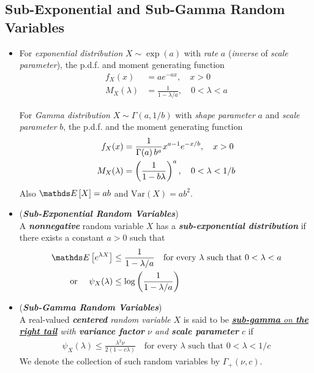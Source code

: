\documentclass[11pt]{article}
\begin{document}
\subsection{Sub-Exponential and Sub-Gamma Random Variables}
\begin{itemize}
\item \begin{remark}
For \emph{exponential distribution} $X \sim \exp(a)$ with \emph{rate} $a$ (\emph{inverse} of \emph{scale parameter}), the p.d.f. and moment generating function
\begin{align*}
f_{X}(x) &= a e^{-ax},\quad  x > 0\\
M_{X}(\lambda) &= \frac{1}{1  - \lambda/a},\quad  0 < \lambda < a
\end{align*}

For \emph{Gamma distribution} $X \sim \Gamma(a, 1/b)$ with \emph{shape parameter} $a$ and \emph{scale parameter} $b$, the p.d.f. and the moment generating function
\begin{align*}
f_{X}(x) &= \frac{1}{\Gamma(a)\,b^a} x^{a-1} e^{-x/b},\quad  x > 0\\
M_{X}(\lambda) &= \left(\frac{1}{1  - b \lambda }\right)^{a},\quad  0 < \lambda < 1/b
\end{align*}Also $\E{}{X} = ab$ and $\text{Var}(X) = ab^2$.
\end{remark}



\item \begin{definition}(\emph{\textbf{Sub-Exponential Random Variables}})\\
A \emph{\textbf{nonnegative}} random variable $X$ has a \emph{\textbf{sub-exponential distribution}} if there exists a constant $a > 0$ such that
\begin{align*}
\E{}{e^{\lambda X}} &\le \frac{1}{1 - \lambda/a} \quad \text{for every $\lambda$ such that $0 < \lambda < a$} \\
\text{or }\quad \psi_X(\lambda) &\le \log\paren{ \frac{1}{1 - \lambda/a}}
\end{align*}
\end{definition}

\item \begin{definition}(\emph{\textbf{Sub-Gamma Random Variables}})\\
A real-valued \emph{\textbf{centered} random variable} $X$ is said to be \emph{\underline{\textbf{sub-gamma} on \textbf{the right tail}} with \textbf{variance factor} $\nu$ and \textbf{scale parameter} $c$} if
\begin{align*}
\psi_X(\lambda)  \le \frac{\lambda^2 \nu}{2(1 - c\lambda)} \quad \text{for every $\lambda$ such that $0 < \lambda < 1/c$} 
\end{align*} We denote the collection of such random variables by $\Gamma_{+}(\nu, c)$.


\end{definition}
\end{itemize}
\end{document}
